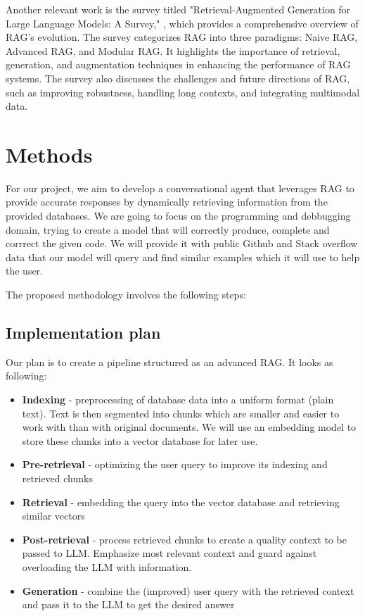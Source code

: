 \documentclass[fleqn,moreauthors,10pt]{ds_report}
\begin{document}
Another relevant work is the survey titled "Retrieval-Augmented Generation for Large Language Models: A Survey," \cite{gao2024retrievalaugmentedgenerationlargelanguage}, which provides a comprehensive overview of RAG's evolution. The survey categorizes RAG into three paradigms: Naive RAG, Advanced RAG, and Modular RAG. It highlights the importance of retrieval, generation, and augmentation techniques in enhancing the performance of RAG systems. The survey also discusses the challenges and future directions of RAG, such as improving robustness, handling long contexts, and integrating multimodal data.
	


\section*{Methods}
For our project, we aim to develop a conversational agent that leverages RAG to provide accurate responses by dynamically retrieving information from the provided databases. We are going to focus on 
the programming and debbugging domain, trying to create a model that will correctly produce, complete and corrrect the given code. We will provide it with public Github \cite{GitHub} and Stack overflow \cite{StackOverflow} data that our model will query and find 
similar examples which it will use to help the user. 

The proposed methodology involves the following steps:

\subsection*{Implementation plan}
Our plan is to create a pipeline structured as an advanced RAG. It looks as following:
\begin{itemize}
    \item \textbf{Indexing} - preprocessing of database data into a uniform format (plain text). Text is then segmented into chunks which are smaller and easier to work with than with original documents. We will use an embedding model to store these chunks into a vector database for later use.
    \item \textbf{Pre-retrieval} - optimizing the user query to improve its indexing and retrieved chunks
    \item \textbf{Retrieval} - embedding the query into the vector database and retrieving similar vectors
    \item \textbf{Post-retrieval} - process retrieved chunks to create a quality context to be passed to LLM. Emphasize most relevant context and guard against overloading the LLM with information. 
    \item \textbf{Generation} - combine the (improved) user query with the retrieved context and pass it to the LLM to get the desired answer
\end{itemize}
\end{document}
